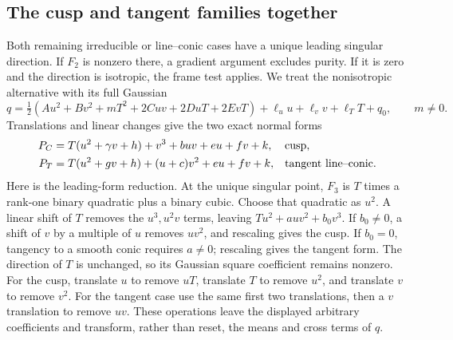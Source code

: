 \subsection{The cusp and tangent families together}
\label{sec:cusptangent}

Both remaining irreducible or line--conic cases have a unique
leading singular direction. If $F_2$ is nonzero there, a gradient
argument excludes purity. If it is zero and the direction is
isotropic, the frame test applies. We treat the nonisotropic
alternative with its full Gaussian
\[
 q=\tfrac12(Au^2+Bv^2+mT^2+2Cuv+2DuT+2EvT)
                  +\ell_u u+\ell_v v+\ell_TT+q_0,
 \qquad m\ne0.
\]
Translations and linear changes give the two exact normal forms
\begin{align}
 P_C&=T(u^2+\gamma v+h)+v^3+buv+eu+fv+k,
                       &&\hbox{cusp},\label{eq:cuspnormal}\\
 P_T&=T(u^2+gv+h)+(u+c)v^2+eu+fv+k,
                       &&\hbox{tangent line--conic}.\label{eq:tangentnormal}
\end{align}
Here is the leading-form reduction. At the unique singular
point, $F_3$ is $T$ times a rank-one binary quadratic plus a
binary cubic. Choose that quadratic as $u^2$. A linear shift
of $T$ removes the $u^3,u^2v$ terms, leaving
$Tu^2+a uv^2+b_0v^3$. If $b_0\ne0$, a shift of $v$ by a
multiple of $u$ removes $uv^2$, and rescaling gives the cusp.
If $b_0=0$, tangency to a smooth conic requires $a\ne0$;
rescaling gives the tangent form. The direction of $T$ is
unchanged, so its Gaussian square coefficient remains nonzero.
For the cusp, translate $u$ to remove $uT$, translate $T$ to
remove $u^2$, and translate $v$ to remove $v^2$. For the tangent
case use the same first two translations, then a $v$ translation
to remove $uv$. These operations leave the displayed arbitrary
coefficients and transform, rather than reset, the means and
cross terms of $q$.

